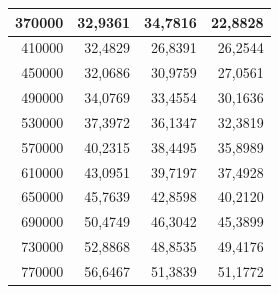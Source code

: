 \documentclass[a4paper, 12pt]{article}
\begin{document}
\begin{longtable}[c]{@{}rrrr@{}}
			\multicolumn{1}{|r|}{370000}                  & \multicolumn{1}{r|}{32,9361}                & \multicolumn{1}{r|}{34,7816}                & \multicolumn{1}{r|}{22,8828}                \\* \midrule
			\multicolumn{1}{|r|}{410000}                  & \multicolumn{1}{r|}{32,4829}                & \multicolumn{1}{r|}{26,8391}                & \multicolumn{1}{r|}{26,2544}                \\* \midrule
			\multicolumn{1}{|r|}{450000}                  & \multicolumn{1}{r|}{32,0686}                & \multicolumn{1}{r|}{30,9759}                & \multicolumn{1}{r|}{27,0561}                \\* \midrule
			\multicolumn{1}{|r|}{490000}                  & \multicolumn{1}{r|}{34,0769}                & \multicolumn{1}{r|}{33,4554}                & \multicolumn{1}{r|}{30,1636}                \\* \midrule
			\multicolumn{1}{|r|}{530000}                  & \multicolumn{1}{r|}{37,3972}                & \multicolumn{1}{r|}{36,1347}                & \multicolumn{1}{r|}{32,3819}                \\* \midrule
			\multicolumn{1}{|r|}{570000}                  & \multicolumn{1}{r|}{40,2315}                & \multicolumn{1}{r|}{38,4495}                & \multicolumn{1}{r|}{35,8989}                \\* \midrule
			\multicolumn{1}{|r|}{610000}                  & \multicolumn{1}{r|}{43,0951}                & \multicolumn{1}{r|}{39,7197}                & \multicolumn{1}{r|}{37,4928}                \\* \midrule
			\multicolumn{1}{|r|}{650000}                  & \multicolumn{1}{r|}{45,7639}                & \multicolumn{1}{r|}{42,8598}                & \multicolumn{1}{r|}{40,2120}                \\* \midrule
			\multicolumn{1}{|r|}{690000}                  & \multicolumn{1}{r|}{50,4749}                & \multicolumn{1}{r|}{46,3042}                & \multicolumn{1}{r|}{45,3899}                \\* \midrule
			\multicolumn{1}{|r|}{730000}                  & \multicolumn{1}{r|}{52,8868}                & \multicolumn{1}{r|}{48,8535}                & \multicolumn{1}{r|}{49,4176}                \\* \midrule
			\multicolumn{1}{|r|}{770000}                  & \multicolumn{1}{r|}{56,6467}                & \multicolumn{1}{r|}{51,3839}                & \multicolumn{1}{r|}{51,1772}                \\* \midrule

\end{longtable}
\end{document}
